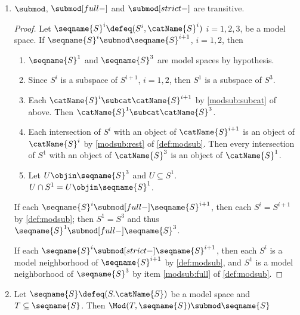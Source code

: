 \documentclass{article}
\begin{document}
\begin{lemma}
\label{lem:modsub}

\begin{enumerate}

\item
$\submod$, $\submod[full-]$ and $\submod[strict-]$ are transitive.

\begin{proof}
Let $\seqname{S}^i \defeq (S^i, \catName{S}^i)$ $i=1,2,3$, be a model
space. If $\seqname{S}^i \submod \seqname{S}^{i+1}$, $i=1,2$, then

\begin{enumerate}
\item
$\seqname{S}^1$ and $\seqname{S}^3$ are model spaces by hypothesis.

\item Since $S^i$ is a subspace of $S^{i+1}$, $i=1,2$, then $S^1$ is a
subspace of $S^3$.

\item
Each $\catName{S}^i \subcat \catName{S}^{i+1}$ by
{
  \showlabelsinline
  \cref{modsub:subcat}
}
of  above.
Then $\catName{S}^1 \subcat \catName{S}^3$.

\item
Each intersection of $S^i$ with an object of $\catName{S}^{i+1}$
is an object of $\catName{S}^i$ by
{
  \showlabelsinline
  \cref{modsub:rest}
}
of \cref{def:modsub}. Then every intersection of $S^1$ with an object
of $\catName{S}^3$ is an object of $\catName{S}^1$.

\item
Let $U \objin \seqname{S}^3$ and $U \subseteq S^1$.
$U \cap S^1 = U \objin \seqname{S}^1$.
\end{enumerate}

If each $\seqname{S}^i \submod[full-] \seqname{S}^{i+1}$, then each
$S^i = S^{i+1}$ by \cref{def:modsub}; then $S^1 = S^3$ and thus
$\seqname{S}^1 \submod[full-] \seqname{S}^3$.

If each $\seqname{S}^i \submod[strict-] \seqname{S}^{i+1}$, then each
$S^i$ is a model neighborhood of $\seqname{S}^{i+1}$ by
\cref{def:modsub}, and $S^1$ is a model neighborhood of
$\seqname{S}^3$ by item
{
  \showlabelsinline
  \cref{modsub:full}
}
of \cref{def:modsub}.
\end{proof}

\item
Let $\seqname{S} \defeq (S.\catName{S})$ be a model space and
$T \subseteq \seqname{S}$. Then
$\Mod(T,\seqname{S}) \submod \seqname{S}$


\end{enumerate}
\end{lemma}
\end{document}

